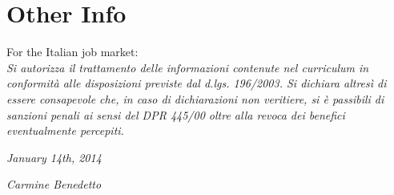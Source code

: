 \documentclass[]{friggeri-cv}
\begin{document}
\newpage

\section{Other Info}
For the Italian job market:\\
\emph{Si autorizza il trattamento delle informazioni contenute nel curriculum in conformità alle disposizioni previste dal d.lgs. 196/2003. Si dichiara altresì di essere consapevole che, in caso di dichiarazioni non veritiere, si è passibili di sanzioni penali ai sensi del DPR 445/00 oltre alla revoca dei benefici eventualmente percepiti.}
\\
\begin{flushleft}
\emph{January 14th, 2014}
\end{flushleft}
\begin{flushright}
\emph{Carmine Benedetto}
\end{flushright}
\end{document}
